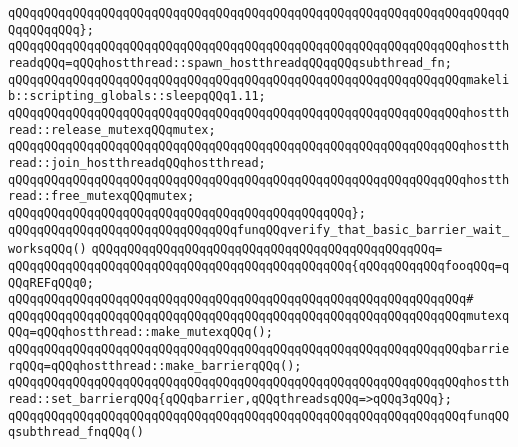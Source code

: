 \verb|qQQqqQQqqQQqqQQqqQQqqQQqqQQqqQQqqQQqqQQqqQQqqQQqqQQqqQQqqQQqqQQqqQQqqQQqqQQqqQQq};|\newline
\newline
\verb|qQQqqQQqqQQqqQQqqQQqqQQqqQQqqQQqqQQqqQQqqQQqqQQqqQQqqQQqqQQqqQQqhostthreadqQQq=qQQqhostthread::spawn_hostthreadqQQqqQQqsubthread_fn;|\newline
\newline
\verb|qQQqqQQqqQQqqQQqqQQqqQQqqQQqqQQqqQQqqQQqqQQqqQQqqQQqqQQqqQQqqQQqmakelib::scripting_globals::sleepqQQq1.11;|\newline
\newline
\verb|qQQqqQQqqQQqqQQqqQQqqQQqqQQqqQQqqQQqqQQqqQQqqQQqqQQqqQQqqQQqqQQqhostthread::release_mutexqQQqmutex;|\newline
\newline
\verb|qQQqqQQqqQQqqQQqqQQqqQQqqQQqqQQqqQQqqQQqqQQqqQQqqQQqqQQqqQQqqQQqhostthread::join_hostthreadqQQqhostthread;|\newline
\newline
\verb|qQQqqQQqqQQqqQQqqQQqqQQqqQQqqQQqqQQqqQQqqQQqqQQqqQQqqQQqqQQqqQQqhostthread::free_mutexqQQqmutex;|\newline
\verb|qQQqqQQqqQQqqQQqqQQqqQQqqQQqqQQqqQQqqQQqqQQqqQQq};|\newline
\newline
\verb|qQQqqQQqqQQqqQQqqQQqqQQqqQQqqQQqfunqQQqverify_that_basic_barrier_wait_worksqQQq()|\newline
\verb|qQQqqQQqqQQqqQQqqQQqqQQqqQQqqQQqqQQqqQQqqQQqqQQq=|\newline
\verb|qQQqqQQqqQQqqQQqqQQqqQQqqQQqqQQqqQQqqQQqqQQqqQQq{qQQqqQQqqQQqfooqQQq=qQQqREFqQQq0;|\newline
\verb|qQQqqQQqqQQqqQQqqQQqqQQqqQQqqQQqqQQqqQQqqQQqqQQqqQQqqQQqqQQqqQQq#|\newline
\verb|qQQqqQQqqQQqqQQqqQQqqQQqqQQqqQQqqQQqqQQqqQQqqQQqqQQqqQQqqQQqqQQqmutexqQQq=qQQqhostthread::make_mutexqQQq();|\newline
\newline
\verb|qQQqqQQqqQQqqQQqqQQqqQQqqQQqqQQqqQQqqQQqqQQqqQQqqQQqqQQqqQQqqQQqbarrierqQQq=qQQqhostthread::make_barrierqQQq();|\newline
\verb|qQQqqQQqqQQqqQQqqQQqqQQqqQQqqQQqqQQqqQQqqQQqqQQqqQQqqQQqqQQqqQQqhostthread::set_barrierqQQq{qQQqbarrier,qQQqthreadsqQQq=>qQQq3qQQq};|\newline
\newline
\verb|qQQqqQQqqQQqqQQqqQQqqQQqqQQqqQQqqQQqqQQqqQQqqQQqqQQqqQQqqQQqqQQqfunqQQqsubthread_fnqQQq()|\newline
